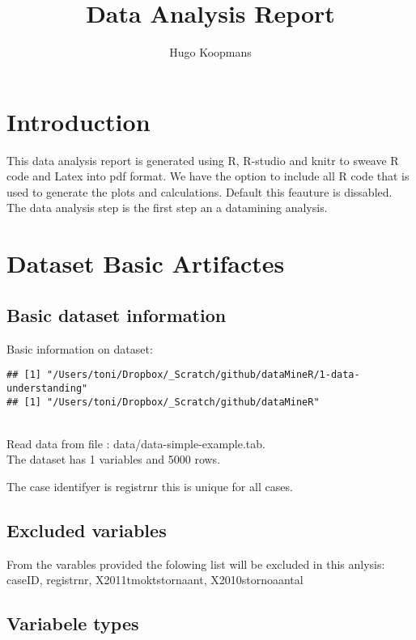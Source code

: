 \documentclass[10pt,a4paper,titlepage]{report}
\author{Hugo Koopmans}
\title{Data Analysis Report}
\begin{document}
\maketitle
\tableofcontents
\newpage
\section{Introduction}
This data analysis report is generated using R, R-studio and knitr to sweave R code and Latex into pdf format. We have the option to include all R code that is used to generate the plots and calculations. Default this feauture is dissabled.\\
The data analysis step is the first step an a datamining analysis.
\section{Dataset Basic Artifactes}

\subsection{Basic dataset information}
Basic information on dataset:\\




\begin{knitrout}
\color{fgcolor}\begin{kframe}
\begin{verbatim}
## [1] "/Users/toni/Dropbox/_Scratch/github/dataMineR/1-data-understanding"
## [1] "/Users/toni/Dropbox/_Scratch/github/dataMineR"
\end{verbatim}
\end{kframe}
\end{knitrout}

\\
Read data from file : data/data-simple-example.tab.\\
The dataset has 1 variables and 5000 rows.

The case identifyer is registrnr this is unique for all cases.

\subsection{Excluded variables}
From the varables provided the folowing list will be excluded in this anlysis: caseID, registrnr, X2011tmoktstornaant, X2010stornoaantal

\subsection{Variabele types}
\end{document}
